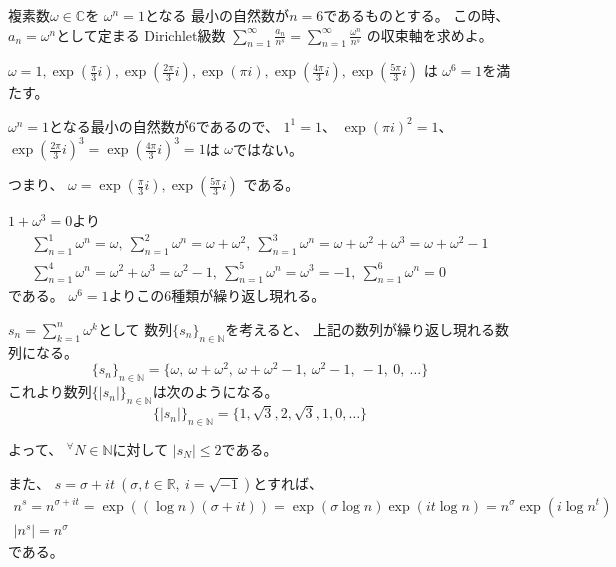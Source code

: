 \documentclass[12pt,b5paper]{ltjsarticle}
\begin{document}
\hrulefill


複素数$\omega\in\mathbb{C}$を
$\omega^{n}=1$となる
最小の自然数が$n=6$であるものとする。
この時、
$a_{n}=\omega^{n}$として定まる
Dirichlet級数
$\displaystyle \sum_{n=1}^{\infty}\frac{a_{n}}{n^{s}}
=\sum_{n=1}^{\infty}\frac{\omega^{n}}{n^{s}}$
の収束軸を求めよ。

\dotfill

$\omega = 1, \exp(\frac{\pi}{3}i), \exp(\frac{2\pi}{3}i), \exp(\pi i), \exp(\frac{4\pi}{3}i), \exp(\frac{5\pi}{3}i)$
は
$\omega^{6}=1$を満たす。

$\omega^{n}=1$となる最小の自然数が$6$であるので、
$1^1=1$、
$\exp(\pi i)^2=1$、
$\exp(\frac{2\pi}{3}i)^3=\exp(\frac{4\pi}{3}i)^3=1$は
$\omega$ではない。

つまり、
$\omega = \exp(\frac{\pi}{3}i), \exp(\frac{5\pi}{3}i)$
である。

$1+\omega^3=0$より
\begin{gather}
 \sum_{n=1}^{1}\omega^{n}=\omega,\
 \sum_{n=1}^{2}\omega^{n}=\omega+\omega^2,\
 \sum_{n=1}^{3}\omega^{n}=\omega+\omega^2+\omega^3=\omega+\omega^2-1\\
 \sum_{n=1}^{4}\omega^{n}=\omega^2+\omega^3=\omega^2-1,\
 \sum_{n=1}^{5}\omega^{n}=\omega^3=-1,\
 \sum_{n=1}^{6}\omega^{n}=0
\end{gather}
である。
$\omega^6=1$よりこの6種類が繰り返し現れる。

$s_{n}=\sum_{k=1}^{n}\omega^{k}$として
数列$\{s_{n}\}_{n\in\mathbb{N}}$を考えると、
上記の数列が繰り返し現れる数列になる。
\begin{equation}
 \{s_{n}\}_{n\in\mathbb{N}}=
  \{ \omega,\  \omega+\omega^2,\ \omega+\omega^2-1,\ \omega^2-1,\ -1,\ 0,\ \dots\}
\end{equation}
これより数列$\{ \lvert s_{n} \rvert\}_{n\in\mathbb{N}}$は次のようになる。
\begin{equation}
 \{ \lvert s_{n} \rvert\}_{n\in\mathbb{N}}=
  \{ 1, \sqrt{3}, 2, \sqrt{3}, 1, 0,\dots\}
\end{equation}

よって、
${}^{\forall}N\in\mathbb{N}$に対して
$\lvert s_{N} \rvert \leq 2$である。

また、
$s=\sigma + i t\ (\sigma,t\in\mathbb{R},\ i=\sqrt{-1})$とすれば、
\begin{gather}
 n^s
  =n^{\sigma+it}
  =\exp((\log{n})(\sigma+it))
  =\exp(\sigma\log{n})\exp(it\log{n})
  =n^{\sigma}\exp(i\log{n^t})\\
 \lvert n^{s} \rvert = n^{\sigma}
\end{gather}
である。
\end{document}

